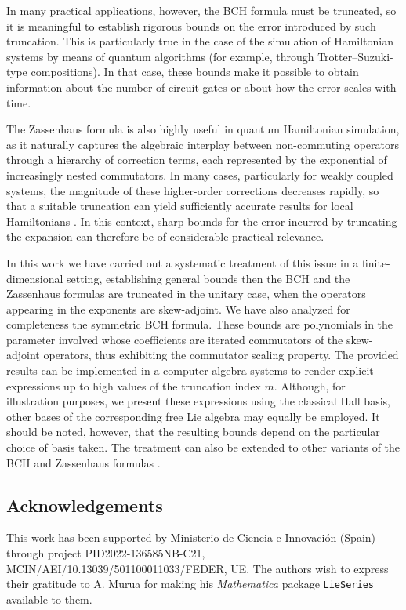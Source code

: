 \documentclass[11pt]{article}
\begin{document}
In many practical applications, however, the BCH formula must be truncated, so it is meaningful to establish rigorous bounds on the error introduced by such truncation. This is particularly true in the case of the simulation of Hamiltonian systems by means of quantum algorithms (for example, through Trotter--Suzuki-type compositions). In that case, these bounds make it possible to obtain information about the number of circuit gates or about how the error scales with time.


The Zassenhaus formula is also highly useful in quantum Hamiltonian simulation, as it naturally captures the algebraic interplay between non-commuting operators through a hierarchy of correction terms, each represented by the exponential of increasingly nested commutators. In many cases, particularly for weakly coupled systems, the magnitude of these higher-order corrections decreases rapidly, so that a suitable truncation can yield sufficiently accurate results for local Hamiltonians \cite{nguyen25zei}. In this context, sharp bounds for the error incurred by truncating the expansion can therefore be of considerable practical relevance.

In this work we have carried out a systematic treatment of this issue in a finite-dimensional setting, 
establishing general bounds then the BCH and the Zassenhaus formulas are
truncated in the unitary case, when the operators appearing in the exponents are skew-adjoint. We have also analyzed for completeness the symmetric
BCH formula. These bounds are polynomials in the parameter
involved whose coefficients are iterated commutators of the skew-adjoint operators, thus exhibiting the commutator scaling property. The provided results can be implemented in a computer algebra systems to render explicit expressions up to high values of the truncation index $m$. Although, for illustration purposes, we present these expressions using the classical Hall basis, other bases of the corresponding free Lie algebra may equally be employed. It should be noted, however, that the resulting bounds depend on the particular choice of basis taken.
The treatment can also be extended to other variants of the BCH \cite{vanbrunt16str} and Zassenhaus formulas \cite{arnal17ots}.





\subsection*{Acknowledgements}
This work has been supported by 
Ministerio de Ciencia e Innovaci\'on (Spain) through project  PID2022-136585NB-C21, 
MCIN/AEI/10.13039/501100011033/FEDER, UE. The authors wish to express their gratitude to A. Murua 
for making his \emph{Mathematica} package \texttt{LieSeries} available to them.
\end{document}
